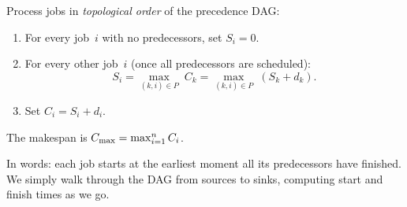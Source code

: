 \begin{definition}
\label{def:cpm-forward}
Process jobs in \emph{topological order} of the precedence DAG:
\begin{enumerate}[nosep]
  \item For every job~$i$ with no predecessors, set $S_i = 0$.
  \item For every other job~$i$ (once all predecessors are
        scheduled):
        \[
          S_i = \max_{(k,i)\in P}\; C_k
              = \max_{(k,i)\in P}\; (S_k + d_k).
        \]
  \item Set $C_i = S_i + d_i$.
\end{enumerate}
The makespan is $C_{\max} = \max_{i=1}^{n} C_i$.
\end{definition}

In words: each job starts at the earliest moment all its
predecessors have finished.  We simply walk through the DAG
from sources to sinks, computing start and finish times as we go.

